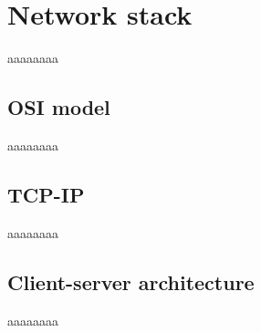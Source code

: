 %
\section{Network stack}
\label{sec:network-stack}
aaaaaaaa

\subsection{OSI model}
\label{sec:osi-model}
aaaaaaaa

\subsection{TCP-IP}
\label{sec:tcp-ip}
aaaaaaaa

\subsection{Client-server architecture}
\label{sec:client-serv-arch}
aaaaaaaa

